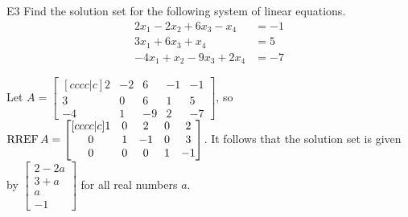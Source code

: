 \documentclass{sbgLAexam}
\begin{document}
\begin{extract}\newpage\end{extract}
\begin{problem}{E3}
Find the solution set for the following system of linear equations.
\begin{align*}
2x_1-2x_2+6x_3-x_4 &=-1 \\
3x_1+6x_3+x_4 &= 5 \\
-4x_1+x_2-9x_3+2x_4&=-7
\end{align*}
\end{problem}
\begin{solution}
Let \(A =
  \begin{bmatrix}[cccc|c]
    2 & -2 & 6 & -1 & -1 \\
    3 & 0 & 6 & 1 & 5 \\
    -4 & 1 & -9 & 2 & -7
  \end{bmatrix}
\), so \(\operatorname{RREF} A =
  \begin{bmatrix}[cccc|c]
    1 & 0 & 2 & 0 & 2 \\
    0 & 1 & -1 & 0 & 3 \\
    0 & 0 & 0 & 1 & -1
  \end{bmatrix}
\). It follows that the solution set is given by \(
  \begin{bmatrix}
    2 - 2a \\
    3 + a \\
    a \\
    -1
  \end{bmatrix}
\) for all real numbers \(a\).
\end{solution}
\end{document}
